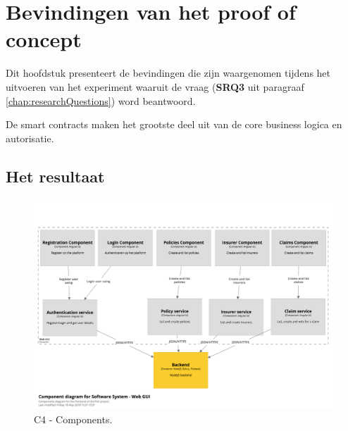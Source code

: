 \chapter{Bevindingen van het proof of concept}\label{chap:q2}
Dit hoofdstuk presenteert de bevindingen die zijn waargenomen tijdens het uitvoeren van het experiment waaruit de vraag \researchQuestionThree (\textbf{SRQ3} uit paragraaf \ref{chap:researchQuestions}) word beantwoord.

De smart contracts maken het grootste deel uit van de core business logica en autorisatie. 


%
%
%
\section{Het resultaat}
\begin{figure}[h!]
    \begin{center}
        \includegraphics[width=\paperwidth-200]{images/components}
        \caption{C4 - Components.}
        \label{fig:c4Compomnents}
    \end{center}
\end{figure}